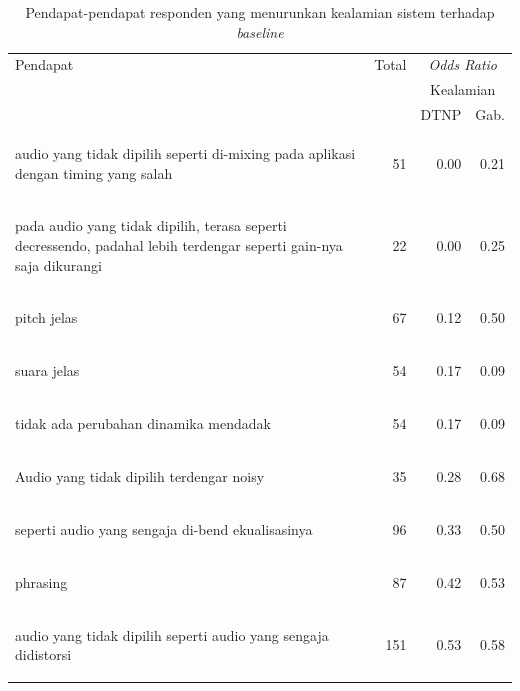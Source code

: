 \begin{table}[htbp]
  \begin{center}
	\caption{Pendapat-pendapat responden yang menurunkan kealamian sistem terhadap \textit{baseline}}\label{tab-pendapat-oddsratio-lessnatural}
	\begin{tabular}{|p{}|r|r|r|}
	\hline
Pendapat&	Total&	\multicolumn{2}{|c|}{\textit{Odds Ratio}}\\
&	&	\multicolumn{2}{|c|}{Kealamian}\\
\cline{3-4}
&	&	DTNP	&Gab.
\\\hline
\begin{intabquote}audio yang tidak dipilih seperti di-mixing pada aplikasi dengan timing yang salah\end{intabquote}&	51&	0.00&	0.21\\\hline
\begin{intabquote}pada audio yang tidak dipilih, terasa seperti decressendo, padahal lebih terdengar seperti gain-nya saja dikurangi\end{intabquote}&	22&	0.00&	0.25\\\hline
\begin{intabquote}pitch jelas\end{intabquote}&	67&	0.12&	0.50\\\hline
\begin{intabquote}suara jelas\end{intabquote}&	54&	0.17&	0.09\\\hline
\begin{intabquote}tidak ada perubahan dinamika mendadak\end{intabquote}&	54&	0.17&	0.09\\\hline
\begin{intabquote}Audio yang tidak dipilih terdengar noisy\end{intabquote}&	35&	0.28&	0.68\\\hline
\begin{intabquote}seperti audio yang sengaja di-bend ekualisasinya\end{intabquote}&	96&	0.33&	0.50\\\hline
\begin{intabquote}phrasing\end{intabquote}&	87&	0.42&	0.53\\\hline
\begin{intabquote}audio yang tidak dipilih seperti audio yang sengaja didistorsi\end{intabquote}&	151&	0.53&	0.58\\\hline

\end{tabular}
\end{center}
\end{table}

